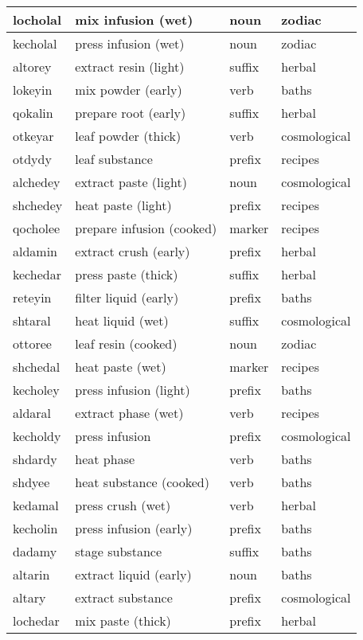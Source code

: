 \documentclass[12pt]{article}
\begin{document}
\begin{longtable}{|l|l|l|l|}
locholal & mix infusion (wet) & noun & zodiac \\ \hline
kecholal & press infusion (wet) & noun & zodiac \\ \hline
altorey & extract resin (light) & suffix & herbal \\ \hline
lokeyin & mix powder (early) & verb & baths \\ \hline
qokalin & prepare root (early) & suffix & herbal \\ \hline
otkeyar & leaf powder (thick) & verb & cosmological \\ \hline
otdydy & leaf substance & prefix & recipes \\ \hline
alchedey & extract paste (light) & noun & cosmological \\ \hline
shchedey & heat paste (light) & prefix & recipes \\ \hline
qocholee & prepare infusion (cooked) & marker & recipes \\ \hline
aldamin & extract crush (early) & prefix & herbal \\ \hline
kechedar & press paste (thick) & suffix & herbal \\ \hline
reteyin & filter liquid (early) & prefix & baths \\ \hline
shtaral & heat liquid (wet) & suffix & cosmological \\ \hline
ottoree & leaf resin (cooked) & noun & zodiac \\ \hline
shchedal & heat paste (wet) & marker & recipes \\ \hline
kecholey & press infusion (light) & prefix & baths \\ \hline
aldaral & extract phase (wet) & verb & recipes \\ \hline
kecholdy & press infusion & prefix & cosmological \\ \hline
shdardy & heat phase & verb & baths \\ \hline
shdyee & heat substance (cooked) & verb & baths \\ \hline
kedamal & press crush (wet) & verb & herbal \\ \hline
kecholin & press infusion (early) & prefix & baths \\ \hline
dadamy & stage substance & suffix & baths \\ \hline
altarin & extract liquid (early) & noun & baths \\ \hline
altary & extract substance & prefix & cosmological \\ \hline
lochedar & mix paste (thick) & prefix & herbal \\ \hline

\end{longtable}
\end{document}
